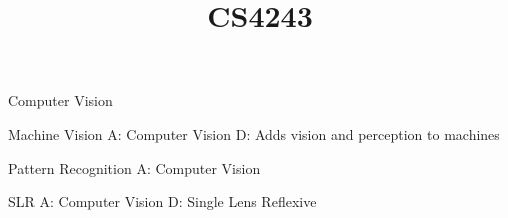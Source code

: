 \documentclass{article}
\title{CS4243}
\begin{document}
Computer Vision

Machine Vision
A: Computer Vision
D: Adds vision and perception to machines

Pattern Recognition
A: Computer Vision

SLR
A: Computer Vision
D: Single Lens Reflexive
\end{document}
